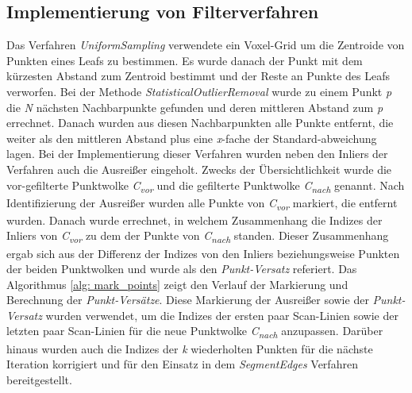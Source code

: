 \subsection{Implementierung von Filterverfahren}
Das Verfahren \textit{UniformSampling} verwendete ein Voxel-Grid um die Zentroide von Punkten eines Leafs zu bestimmen. Es wurde danach der Punkt mit dem kürzesten Abstand zum Zentroid bestimmt und der Reste an Punkte des Leafs verworfen. Bei der Methode \textit{StatisticalOutlierRemoval} wurde zu einem Punkt \textit{p} die \textit{N} nächsten Nachbarpunkte gefunden und deren mittleren Abstand zum \textit{p} errechnet. Danach wurden aus diesen Nachbarpunkten alle Punkte entfernt, die weiter als den mittleren Abstand plus eine \textit{x}-fache der Standard-abweichung lagen. Bei der Implementierung dieser Verfahren wurden neben den Inliers der Verfahren auch die Ausreißer eingeholt. Zwecks der Übersichtlichkeit wurde die vor-gefilterte Punktwolke \textit{C\textsubscript{vor}} und die gefilterte Punktwolke \textit{C\textsubscript{nach}} genannt. Nach Identifizierung der Ausreißer wurden alle Punkte von \textit{C\textsubscript{vor}} markiert, die entfernt wurden. Danach wurde errechnet, in welchem Zusammenhang die Indizes der Inliers von \textit{C\textsubscript{vor}} zu dem der Punkte von \textit{C\textsubscript{nach}} standen. Dieser Zusammenhang ergab sich aus der Differenz der Indizes von den Inliers beziehungsweise Punkten der beiden Punktwolken und wurde als den \textit{Punkt-Versatz} referiert. Das Algorithmus \ref{alg: mark_points} zeigt den Verlauf der Markierung und Berechnung der \textit{Punkt-Versätze}. Diese Markierung der Ausreißer sowie der \textit{Punkt-Versatz} wurden verwendet, um die Indizes der ersten paar Scan-Linien sowie der letzten paar Scan-Linien für die neue Punktwolke \textit{C\textsubscript{nach}} anzupassen. Darüber hinaus wurden auch die Indizes der \textit{k} wiederholten Punkten für die nächste Iteration korrigiert und für den Einsatz in dem \textit{SegmentEdges} Verfahren bereitgestellt. 

